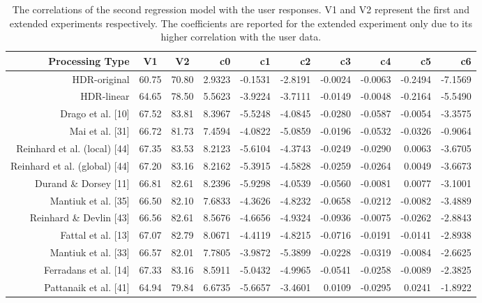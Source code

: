 \begin{sidewaystable}
\caption{The correlations of the second regression model with the user responses. V1 and V2 represent the first
and extended experiments respectively. The coefficients are reported for the extended experiment only due to its
higher correlation with the user data.}
\centering
\begin{tabular}{r|c c || r r r r r r r}
\label{tab:correlation_duplet_model}
\textbf{Processing Type} & \textbf{V1} & \textbf{V2} & \textbf{c0} & \textbf{c1} & \textbf{c2} & \textbf{c3} & 
\textbf{c4} & \textbf{c5} & \textbf{c6}\\
\hline
HDR-original & 60.75 & 70.80 & 2.9323 & -0.1531 & -2.8191 & -0.0024 & -0.0063 & -0.2494 & -7.1569 \\
HDR-linear & 64.65 & 78.50 & 5.5623 & -3.9224 & -3.7111 & -0.0149 & -0.0048 & -0.2164 & -5.5490 \\
Drago et al. [10] & 67.52 & 83.81 & 8.3967 & -5.5248 & -4.0845 & -0.0280 & -0.0587 & -0.0054 & -3.3575 \\
Mai et al. [31] & 66.72 & 81.73 & 7.4594 & -4.0822 & -5.0859 & -0.0196 & -0.0532 & -0.0326 & -0.9064 \\
Reinhard et al. (local) [44] & 67.35 & 83.53 & 8.2123 & -5.6104 & -4.3743 & -0.0249 & -0.0290 & 0.0063 & -3.6705 \\
Reinhard et al. (global) [44] & 67.20 & 83.16 & 8.2162 & -5.3915 & -4.5828 & -0.0259 & -0.0264 & 0.0049 & -3.6673 \\
Durand \& Dorsey [11] & 66.81 & 82.61 & 8.2396 & -5.9298 & -4.0539 & -0.0560 & -0.0081 & 0.0077 & -3.1001 \\
Mantiuk et al. [35] & 66.50 & 82.10 & 7.6833 & -4.3626 & -4.8232 & -0.0658 & -0.0212 & -0.0082 & -3.4889 \\
Reinhard \& Devlin [43] & 66.56 & 82.61 & 8.5676 & -4.6656 & -4.9324 & -0.0936 & -0.0075 & -0.0262 & -2.8843 \\
Fattal et al. [13] & 67.07 & 82.79 & 8.0671 & -4.4119 & -4.8215 & -0.0716 & -0.0191 & -0.0141 & -2.8938 \\
Mantiuk et al. [33] & 66.57 & 82.01 & 7.7805 & -3.9872 & -5.3899 & -0.0228 & -0.0319 & -0.0084 & -2.6625 \\
Ferradans et al. [14] & 67.33 & 83.16 & 8.5911 & -5.0432 & -4.9965 & -0.0541 & -0.0258 & -0.0089 & -2.3825 \\
Pattanaik et al. [41] & 64.94 & 79.84 & 6.6735 & -5.6657 & -3.4601 & 0.0109 & -0.0295 & 0.0241 & -1.8922
\end{tabular}
\end{sidewaystable}
